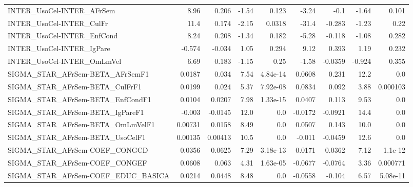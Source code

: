 \begin{tabular}{lrrrrrrrr}
INTER\_UsoCel-INTER\_AFrSem             &        8.96 &        0.206 &   -1.54 &    0.123 &      -3.24 &        -0.1 &        -1.64 &         0.101 \\
INTER\_UsoCel-INTER\_CulFr              &        11.4 &        0.174 &   -2.15 &   0.0318 &      -31.4 &      -0.283 &        -1.23 &          0.22 \\
INTER\_UsoCel-INTER\_EnfCond            &        8.24 &        0.208 &   -1.34 &    0.182 &      -5.28 &      -0.118 &        -1.08 &         0.282 \\
INTER\_UsoCel-INTER\_IgPare             &      -0.574 &       -0.034 &    1.05 &    0.294 &       9.12 &       0.393 &         1.19 &         0.232 \\
INTER\_UsoCel-INTER\_OmLmVel            &        6.69 &        0.183 &   -1.15 &     0.25 &      -1.58 &     -0.0359 &       -0.924 &         0.355 \\
SIGMA\_STAR\_AFrSem-BETA\_AFrSemF1       &      0.0187 &        0.034 &    7.54 & 4.84e-14 &     0.0608 &       0.231 &         12.2 &           0.0 \\
SIGMA\_STAR\_AFrSem-BETA\_CulFrF1        &      0.0199 &        0.024 &    5.37 & 7.92e-08 &     0.0834 &       0.092 &         3.88 &      0.000103 \\
SIGMA\_STAR\_AFrSem-BETA\_EnfCondF1      &      0.0104 &       0.0207 &    7.98 & 1.33e-15 &     0.0407 &       0.113 &         9.53 &           0.0 \\
SIGMA\_STAR\_AFrSem-BETA\_IgPareF1       &      -0.003 &      -0.0145 &    12.0 &      0.0 &    -0.0172 &     -0.0921 &         14.4 &           0.0 \\
SIGMA\_STAR\_AFrSem-BETA\_OmLmVelF1      &     0.00731 &       0.0158 &    8.49 &      0.0 &     0.0507 &       0.143 &         10.0 &           0.0 \\
SIGMA\_STAR\_AFrSem-BETA\_UsoCelF1       &     0.00135 &      0.00413 &    10.5 &      0.0 &     -0.011 &     -0.0459 &         12.6 &           0.0 \\
SIGMA\_STAR\_AFrSem-COEF\_CONGCD         &      0.0356 &       0.0625 &    7.29 & 3.18e-13 &     0.0171 &      0.0362 &         7.12 &       1.1e-12 \\
SIGMA\_STAR\_AFrSem-COEF\_CONGEF         &      0.0608 &        0.063 &    4.31 & 1.63e-05 &    -0.0677 &     -0.0764 &         3.36 &      0.000771 \\
SIGMA\_STAR\_AFrSem-COEF\_EDUC\_BASICA    &      0.0214 &       0.0448 &    8.48 &      0.0 &    -0.0558 &      -0.104 &         6.57 &      5.08e-11 \\

\end{tabular}
